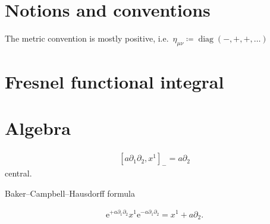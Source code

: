 \documentclass[12pt]{article}
\newcommand\me{\mathrm{e}} %
\DeclareMathOperator{\diag}{diag}
\newcommand{\sbr}[1]{{\left[#1\right]}}
\newcommand{\rfun}[2]{{#1}\mathopen{}\left(#2\right)\mathclose{}}
\begin{document}

\appendix

\section{Notions and conventions}

The metric convention is mostly positive, i.e.\
$\eta_{\mu\nu} \coloneqq \rfun{\diag}{-, +, +, \ldots}$


\section{Fresnel functional integral}

\citep[ch.~10]{mosel2004}

\section{Algebra}
\begin{align}
\sbr{a\partial_1 \partial_2, x^1}_- = a\partial_2
\end{align}
central.

Baker--Campbell--Hausdorff formula

\begin{align}
\me^{+a\partial_1\partial_2} x^1 \me^{-a\partial_1\partial_2}
= x^1 + a \partial_2.
\end{align}






\end{document}
